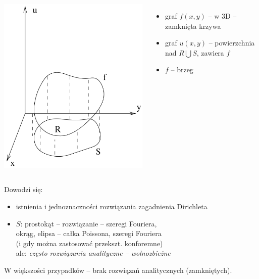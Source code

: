 \begin{frame}
  \begin{columns}
      \includegraphics[width = \linewidth]{img/23/dirichlet}
      \begin{itemize}
        \item graf $f(x,y)$ -- w 3D -- zamknięta krzywa
        \item graf $u(x,y)$ -- powierzchnia nad $R \bigcup S$, zawiera $f$
        \item $f$ -- brzeg
      \end{itemize}
  \end{columns}
\end{frame}

\begin{frame}
  Dowodzi się:
  \begin{itemize}
    \item istnienia i jednoznaczności rozwiązania zagadnienia Dirichleta
    \item $S$: prostokąt -- rozwiązanie -- szeregi Fouriera, \\
    okrąg, elipsa -- całka Poissona, szeregi Fouriera \\
    (i gdy można zastosować przekszt. konforemne) \\
    ale: \textit{często rozwiązania analityczne -- wolnozbieżne}
  \end{itemize}

  W większości przypadków -- brak rozwiązań analitycznych (zamkniętych).
\end{frame}

